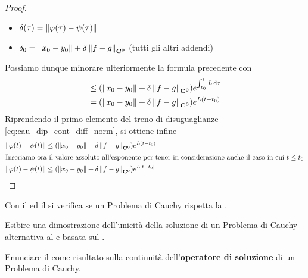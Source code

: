 \begin{theorem}
\begin{proof}
\begin{itemize}
			\item $\delta(\tau) = \left\|\varphi(\tau) - \psi(\tau)\right\|$
			\item $\delta_0 = \left\|x_0 - y_0\right\| + \delta\left\|f-g\right\|_{\mathbf{C^{0}}}$ (tutti gli altri addendi)
		\end{itemize}
		Possiamo dunque minorare ulteriormente la formula precedente con
		\begin{align*}
			&\leq (\left\|x_0 - y_0\right\| + \delta\left\|f-g\right\|_{\mathbf{C^{0}}}) e^{\int_{t_0}^{t}L\,\mathrm{d}{\tau}}\\
			&= (\left\|x_0 - y_0\right\| + \delta\left\|f-g\right\|_{\mathbf{C^{0}}}) e^{L(t-t_0)}
		\end{align*}
		Riprendendo il primo elemento del treno di disuguaglianze \cref{eq:cau_dip_cont_diff_norm}, si ottiene infine
		\begin{align*}
			\left\|\varphi(t)-\psi(t)\right\| &\leq (\left\|x_0 - y_0\right\| + \delta\left\|f-g\right\|_{\mathbf{C^{0}}}) e^{L(t-t_0)}\\
			\intertext{Inseriamo ora il valore assoluto all'esponente per tener in considerazione anche il caso in cui $t \leq t_0$}
			\left\|\varphi(t)-\psi(t)\right\| &\leq (\left\|x_0 - y_0\right\| + \delta\left\|f-g\right\|_{\mathbf{C^{0}}}) e^{L\left|t-t_0\right|}
		\end{align*}
	\end{proof}
\end{theorem}
\begin{note}
	Con il  ed il  si verifica se un Problema di Cauchy rispetta la .
\end{note}
\begin{exercise}
	Esibire una dimostrazione dell'unicità della soluzione di un Problema di Cauchy alternativa al  e basata sul .
\end{exercise}
\begin{exercise}
	Enunciare il  come risultato sulla continuità dell'\textbf{operatore di soluzione} di un Problema di Cauchy.
\end{exercise}
